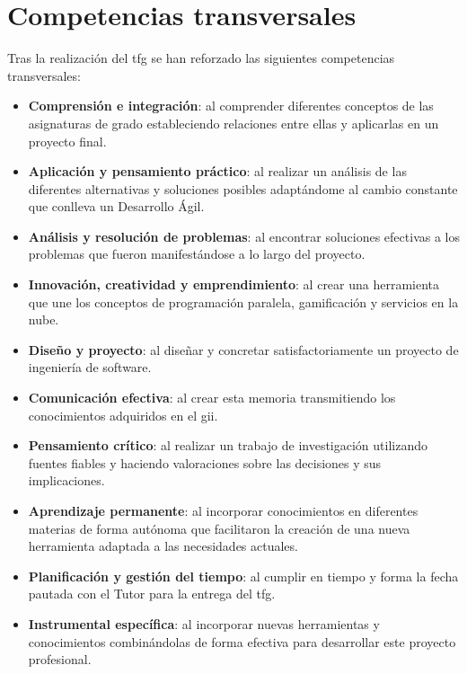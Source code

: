 \documentclass[11pt,spanish,listoffigures,listoftables]{tfgetsinf}
\begin{document}
\section{Competencias transversales}

Tras la realización del \acrshort{tfg} se han reforzado las siguientes competencias transversales:

\begin{itemize}
	\item \textbf{Comprensión e integración}: al comprender diferentes conceptos de las asignaturas de grado estableciendo relaciones entre ellas y aplicarlas en un proyecto final.
	\item \textbf{Aplicación y pensamiento práctico}: al realizar un análisis de las diferentes alternativas y soluciones posibles adaptándome al cambio constante que conlleva un Desarrollo Ágil.
	\item \textbf{Análisis y resolución de problemas}: al encontrar soluciones efectivas a los problemas que fueron manifestándose a lo largo del proyecto.
	\item \textbf{Innovación, creatividad y emprendimiento}: al crear una herramienta que une los conceptos de programación paralela, gamificación y servicios en la nube.
	\item \textbf{Diseño y proyecto}: al diseñar y concretar satisfactoriamente un proyecto de ingeniería de software.
	\item \textbf{Comunicación efectiva}: al crear esta memoria transmitiendo los conocimientos adquiridos en el \acrshort{gii}.
	\item \textbf{Pensamiento crítico}: al realizar un trabajo de investigación utilizando fuentes fiables y haciendo valoraciones sobre las decisiones y sus implicaciones.
	\item \textbf{Aprendizaje permanente}: al incorporar conocimientos en diferentes materias de forma autónoma que facilitaron la creación de una nueva herramienta adaptada a las necesidades actuales.
	\item \textbf{Planificación y gestión del tiempo}: al cumplir en tiempo y forma la fecha pautada con el Tutor para la entrega del \acrshort{tfg}.
	\item \textbf{Instrumental específica}: al incorporar nuevas herramientas y conocimientos combinándolas de forma efectiva para desarrollar este proyecto profesional.
\end{itemize}
\end{document}
